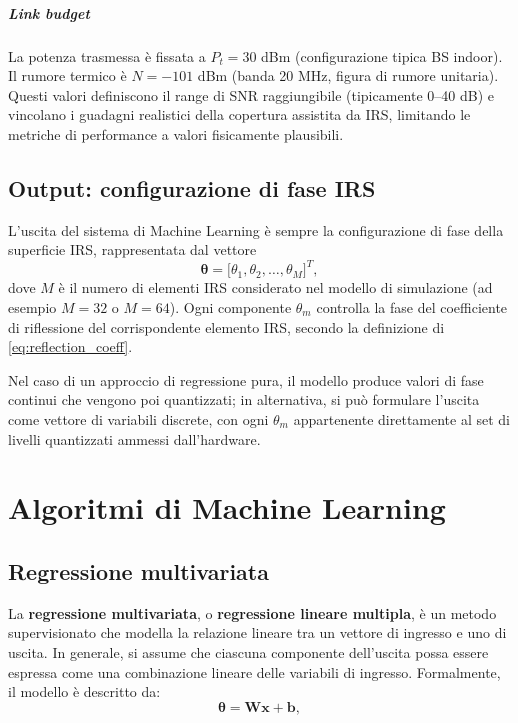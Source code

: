 \documentclass[12pt,a4paper]{report}
\begin{document}
\paragraph{Link budget}
La potenza trasmessa è fissata a $P_t = 30$ dBm (configurazione
tipica BS indoor). Il rumore termico è $N = -101$ dBm (banda 20 MHz,
figura di rumore unitaria). Questi valori definiscono il range di SNR
raggiungibile (tipicamente 0--40 dB) e vincolano i guadagni
realistici della copertura assistita da IRS, limitando le metriche di
performance a valori fisicamente plausibili.

\section{Output: configurazione di fase IRS}
L'uscita del sistema di Machine Learning è sempre la configurazione
di fase della superficie IRS, rappresentata dal vettore
\begin{equation}
  \boldsymbol{\theta} =
  \big[\theta_1, \theta_2, \dots, \theta_M\big]^T,
\end{equation}
dove $M$ è il numero di elementi IRS considerato nel modello di
simulazione (ad esempio $M=32$ o $M=64$). Ogni componente $\theta_m$
controlla la fase del coefficiente di riflessione del corrispondente
elemento IRS, secondo la definizione di \eqref{eq:reflection_coeff}.

Nel caso di un approccio di regressione pura, il modello produce
valori di fase continui che vengono poi quantizzati; in alternativa,
si può formulare l'uscita come vettore di variabili discrete, con
ogni $\theta_m$ appartenente direttamente al set di livelli
quantizzati ammessi dall'hardware.

\chapter{Algoritmi di Machine Learning}
\label{chap:algoritmi}

\section{Regressione multivariata}
La \textbf{regressione multivariata}, o \textbf{regressione lineare
multipla}, è un metodo supervisionato che modella la relazione
lineare tra un vettore di ingresso e uno di uscita. In generale, si
assume che ciascuna componente dell'uscita possa essere espressa come
una combinazione lineare delle variabili di ingresso. Formalmente, il
modello è descritto da:
\begin{equation}
  \boldsymbol{\theta} = \mathbf{W}\mathbf{x} + \mathbf{b},
  \label{eq:regressione_lineare}
\end{equation}
\end{document}
